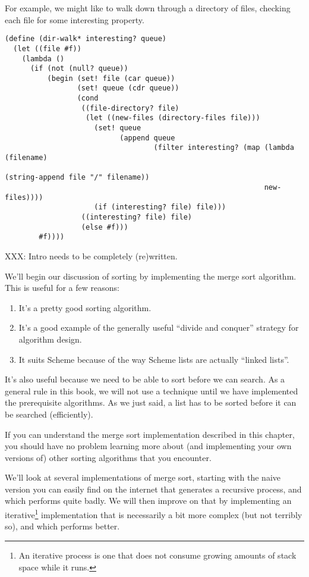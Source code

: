 \documentclass[12pt,openright,draft]{book}
\begin{document}
For example, we might like to walk down through a directory of files,
checking each file for some interesting property.

\begin{verbatim}
(define (dir-walk* interesting? queue)
  (let ((file #f))
    (lambda ()
      (if (not (null? queue))
          (begin (set! file (car queue))
                 (set! queue (cdr queue))
                 (cond
                  ((file-directory? file)
                   (let ((new-files (directory-files file)))
                     (set! queue
                           (append queue
                                   (filter interesting? (map (lambda (filename)
                                                               (string-append file "/" filename))
                                                             new-files))))
                     (if (interesting? file) file)))
                  ((interesting? file) file)
                  (else #f)))
        #f))))
\end{verbatim}

XXX: Intro needs to be completely (re)written.

We'll begin our discussion of sorting by implementing the merge sort
algorithm.  This is useful for a few reasons:

\begin{enumerate}
\item It's a pretty good sorting algorithm.
\item It's a good example of the generally useful ``divide and
  conquer'' strategy for algorithm design.
\item It suits Scheme because of the way Scheme lists are
  actually ``linked lists''.
\end{enumerate}

It's also useful because we need to be able to sort before we can
search.  As a general rule in this book, we will not use a technique
until we have implemented the prerequisite algorithms.  As we just
said, a list has to be sorted before it can be searched (efficiently).

If you can understand the merge sort implementation described in this
chapter, you should have no problem learning more about (and
implementing your own versions of) other sorting algorithms that you
encounter.

We'll look at several implementations of merge sort, starting with the
naive version you can easily find on the internet that generates a
recursive process, and which performs quite badly.  We will then
improve on that by implementing an iterative\footnote{An iterative
  process is one that does not consume growing amounts of stack space
  while it runs.} implementation that is necessarily a bit more
complex (but not terribly so), and which performs better.
\end{document}
